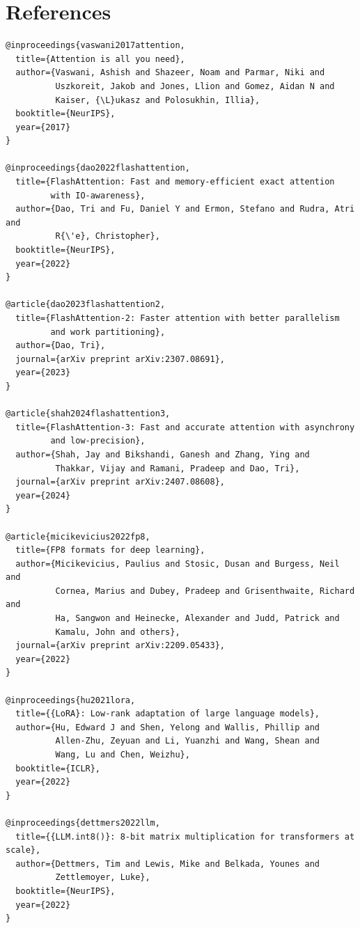 
\section{References}

\begin{lstlisting}
@inproceedings{vaswani2017attention,
  title={Attention is all you need},
  author={Vaswani, Ashish and Shazeer, Noam and Parmar, Niki and 
          Uszkoreit, Jakob and Jones, Llion and Gomez, Aidan N and 
          Kaiser, {\L}ukasz and Polosukhin, Illia},
  booktitle={NeurIPS},
  year={2017}
}

@inproceedings{dao2022flashattention,
  title={FlashAttention: Fast and memory-efficient exact attention 
         with IO-awareness},
  author={Dao, Tri and Fu, Daniel Y and Ermon, Stefano and Rudra, Atri and 
          R{\'e}, Christopher},
  booktitle={NeurIPS},
  year={2022}
}

@article{dao2023flashattention2,
  title={FlashAttention-2: Faster attention with better parallelism 
         and work partitioning},
  author={Dao, Tri},
  journal={arXiv preprint arXiv:2307.08691},
  year={2023}
}

@article{shah2024flashattention3,
  title={FlashAttention-3: Fast and accurate attention with asynchrony 
         and low-precision},
  author={Shah, Jay and Bikshandi, Ganesh and Zhang, Ying and 
          Thakkar, Vijay and Ramani, Pradeep and Dao, Tri},
  journal={arXiv preprint arXiv:2407.08608},
  year={2024}
}

@article{micikevicius2022fp8,
  title={FP8 formats for deep learning},
  author={Micikevicius, Paulius and Stosic, Dusan and Burgess, Neil and 
          Cornea, Marius and Dubey, Pradeep and Grisenthwaite, Richard and 
          Ha, Sangwon and Heinecke, Alexander and Judd, Patrick and 
          Kamalu, John and others},
  journal={arXiv preprint arXiv:2209.05433},
  year={2022}
}

@inproceedings{hu2021lora,
  title={{LoRA}: Low-rank adaptation of large language models},
  author={Hu, Edward J and Shen, Yelong and Wallis, Phillip and 
          Allen-Zhu, Zeyuan and Li, Yuanzhi and Wang, Shean and 
          Wang, Lu and Chen, Weizhu},
  booktitle={ICLR},
  year={2022}
}

@inproceedings{dettmers2022llm,
  title={{LLM.int8()}: 8-bit matrix multiplication for transformers at scale},
  author={Dettmers, Tim and Lewis, Mike and Belkada, Younes and 
          Zettlemoyer, Luke},
  booktitle={NeurIPS},
  year={2022}
}


\end{lstlisting}
